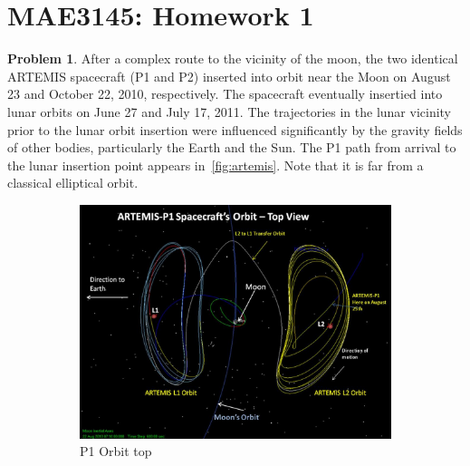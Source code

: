 \documentclass[10pt]{article}
\date{}
\theoremstyle{definition}
\newtheorem{prob}{Problem}[section]
\begin{document}
\pagestyle{empty}
\section*{MAE3145: Homework 1}
\vspace*{-0.4cm}

\begin{prob}
    After a complex route to the vicinity of the moon, the two identical ARTEMIS spacecraft (P1 and P2) inserted into orbit near the Moon on August 23 and October 22, 2010, respectively. 
    The spacecraft eventually insertied into lunar orbits on June 27 and July 17, 2011.
    The trajectories in the lunar vicinity prior to the lunar orbit insertion were influenced significantly by the gravity fields of other bodies, particularly the Earth and the Sun. 
    The P1 path from arrival to the lunar insertion point appears in~\cref{fig:artemis}.
    Note that it is far from a classical elliptical orbit.
    \begin{figure}[htbp]
        \centering
        \begin{subfigure}[htbp]{0.5\textwidth} 
            \includegraphics[width=\textwidth, keepaspectratio]{figures/artemis_top.jpg} 
            \caption{P1 Orbit top \label{fig:top_view}} 
        \end{subfigure}~
        \begin{subfigure}[htbp]{0.5\textwidth} 

\end{subfigure}
\end{figure}
\end{prob}
\end{document}
